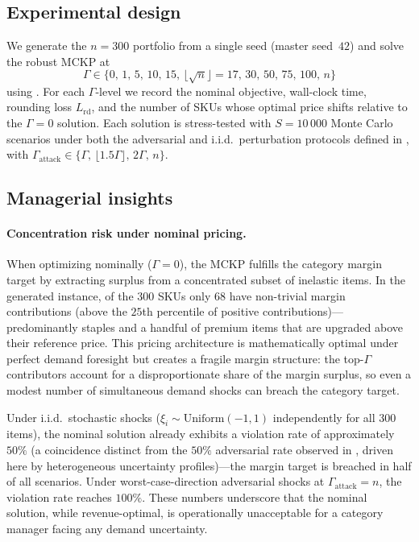\documentclass[11pt, a4paper]{article}
\theoremstyle{plain}
\theoremstyle{definition}
\theoremstyle{remark}
\begin{document}
\subsection{Experimental design}
\label{subsec:case_experiment}

We generate the $n=300$ portfolio from a single seed (master seed~$42$) and solve the robust
MCKP at
\[
\Gamma \in \{0,\,1,\,5,\,10,\,15,\,\lfloor\sqrt{n}\rfloor{=}17,\,30,\,50,\,75,\,100,\,n\}
\]
using .
For each $\Gamma$-level we record the nominal objective, wall-clock time, rounding loss
$L_{\mathrm{rd}}$, and the number of SKUs whose optimal price shifts relative to the
$\Gamma=0$ solution.
Each solution is stress-tested with $S=10\,000$ Monte Carlo scenarios under both the
adversarial and i.i.d.\ perturbation protocols defined in ,
with $\Gamma_{\mathrm{attack}} \in \{\Gamma,\,\lfloor1.5\Gamma\rfloor,\,2\Gamma,\,n\}$.



\subsection{Managerial insights}
\label{subsec:case_insights}

\paragraph{Concentration risk under nominal pricing.}
When optimizing nominally ($\Gamma=0$), the MCKP fulfills the category margin target by
extracting surplus from a concentrated subset of inelastic items. In the generated instance,
of the $300$ SKUs only $68$ have non-trivial margin contributions (above the $25$th percentile
of positive contributions)---predominantly staples and a handful of premium items that are
upgraded above their reference price. This pricing architecture is mathematically optimal under
perfect demand foresight but creates a fragile margin structure: the top-$\Gamma$ contributors
account for a disproportionate share of the margin surplus, so even a modest number of
simultaneous demand shocks can breach the category target.

Under i.i.d.\ stochastic shocks ($\xi_i\sim\mathrm{Uniform}(-1,1)$ independently for all
$300$ items), the nominal solution already exhibits a violation rate of approximately
$50\%$ (a coincidence distinct from the $50\%$ adversarial rate observed in , driven here by heterogeneous uncertainty profiles)---the margin target is breached in half of all scenarios. Under worst-case-direction
adversarial shocks at $\Gamma_{\mathrm{attack}}=n$, the violation rate reaches $100\%$.
These numbers underscore that the nominal solution, while revenue-optimal, is operationally
unacceptable for a category manager facing any demand uncertainty.
\end{document}

